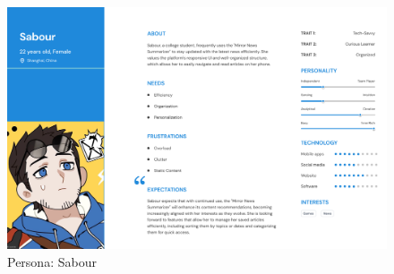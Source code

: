 \documentclass[10pt]{article}
\begin{document}
\begin{figure}[H]
    \centering
    \includegraphics[width=\textwidth]{../persona sabour.png}
    \caption{Persona: Sabour}
    \label{fig:persona-sabour}
\end{figure}

\newpage
\end{document}
